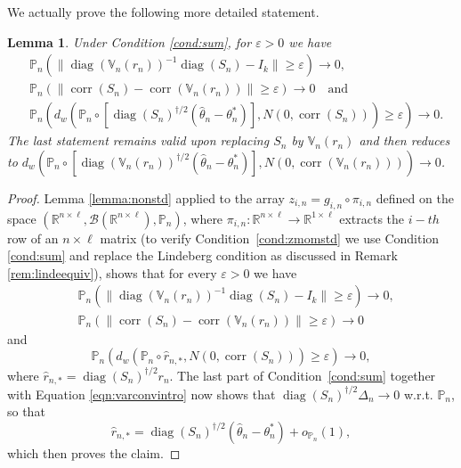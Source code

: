 \documentclass[preprint]{imsart}
\newcommand{\R}{{\mathbb R}}
\newcommand{\eps}{\varepsilon}
\DeclareMathOperator{\diag}{diag}
\DeclareMathOperator{\corr}{corr}
\newtheorem{lemma}[theorem]{Lemma}
\numberwithin{equation}{section}
\begin{document}
We actually prove the following more detailed statement.

\begin{lemma}\label{lemma:equivSn:full}
Under Condition \ref{cond:sum}, for $\eps > 0$ we have
%
\begin{align*}
&\mathbb{P}_n \left( \|\diag(\mathbb{V}_n(r_n))^{-1} \diag(S_n)  - I_k\| \geq \varepsilon \right) \to 0, \\[7pt]
&\mathbb{P}_n \left( \|\corr \left( S_n \right) - \corr \left(  \mathbb{V}_n(r_n) \right)\| \geq \varepsilon \right) \to 0 \quad\text{and}\\[7pt]
&\mathbb{P}_n \left(d_w\left(\mathbb{P}_n \circ  \left[\diag(S_n)^{\dagger/2} \left(\hat{\theta}_n - \theta_n^* \right)\right] , N(0, \corr(S_n))\right) \geq \eps \right) \to 0.
\end{align*}
%
The last statement remains valid upon replacing $S_n$ by $\mathbb{V}_n(r_n)$ and then reduces to $d_w\left(\mathbb{P}_n \circ  \left[\diag(\mathbb{V}_n(r_n))^{\dagger/2} \left(\hat{\theta}_n - \theta_n^* \right)\right] , N(0, \corr(\mathbb{V}_n(r_n)))\right) \to 0$.
\end{lemma}

\begin{proof}
Lemma \ref{lemma:nonstd} applied to the array $z_{i,n} = g_{i,n} \circ \pi_{i,n}$ defined on the space $(\R^{n \times \ell}, \mathcal{B}(\R^{n \times \ell}), \mathbb{P}_n)$, where $\pi_{i,n}: \R^{n \times \ell} \to \R^{1 \times \ell}$ extracts the $i-th$ row of an $n \times \ell$ matrix (to verify Condition~\ref{cond:zmomstd} we use Condition \ref{cond:sum} and replace the Lindeberg condition as discussed in Remark \ref{rem:lindeequiv}), shows that for every $\eps > 0$ we have
%
\begin{align}\label{eqn:varconvintro}
&\mathbb{P}_n \left( \|\diag(\mathbb{V}_n(r_n))^{-1} \diag(S_n)  - I_k\| \geq \varepsilon \right) \to 0, \\
%
&\mathbb{P}_n \left( \|\corr \left( S_n \right) - \corr \left(  \mathbb{V}_n(r_n) \right)\| \geq \varepsilon \right) \to 0
\end{align}
%
and
%
\begin{equation}
\mathbb{P}_n \left( d_w\left(\mathbb{P}_n \circ  \hat{r}_{n,*}  , N(0, \corr(S_n))\right) \geq \eps \right) \to 0,
\end{equation}
%
where $\hat{r}_{n, *} = \diag(S_n)^{\dagger/2} r_n$. The last part of Condition~\ref{cond:sum} together with Equation \eqref{eqn:varconvintro} now shows that $ \diag(S_n)^{\dagger/2} \Delta_n \to 0$ w.r.t. $\mathbb{P}_n$, so that 
%
\begin{equation}
\hat{r}_{n, *} = \diag(S_n)^{\dagger/2} \left( \hat{\theta}_n - \theta^*_n \right) + o_{\mathbb{P}_n}(1),
\end{equation}
%
which then proves the claim.
\end{proof}
\end{document}
